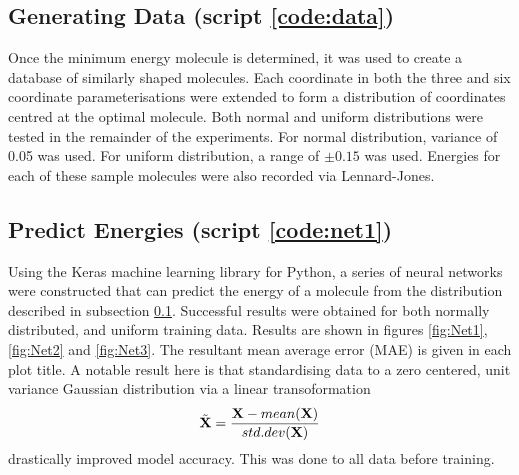 \documentclass[12pt,a4paper]{article}
\begin{document}
\subsection{Generating Data (script \ref{code:data})} \label{subsec:generate}
Once the minimum energy molecule is determined, it was used to create a database of similarly shaped molecules. Each coordinate in both the three and six coordinate parameterisations were extended to form a distribution of coordinates centred at the optimal molecule. Both normal and uniform distributions were tested in the remainder of the experiments. For normal distribution, variance of 0.05 was used. For uniform distribution, a range of $\pm 0.15$ was used. Energies for each of these sample molecules were also recorded via Lennard-Jones.
%
\subsection{Predict Energies (script \ref{code:net1})} \label{subsec:nrg}
Using the Keras\cite{noauthor_keras_nodate} machine learning library for Python, a series of neural networks were constructed that can predict the energy of a molecule from the distribution described in subsection \ref{subsec:generate}. Successful results were obtained for both normally distributed, and uniform training data. Results are shown in figures \ref{fig:Net1}, \ref{fig:Net2} and \ref{fig:Net3}. The resultant mean average error (MAE) is given in each plot title. A notable result here is that standardising data to a zero centered, unit variance Gaussian distribution via a linear transoformation 
\begin{equation*}
    \Tilde{\textbf{X}} = \frac {\textbf{X} - mean(\textbf{X})} {std.dev(\textbf{X})}
\end{equation*}
drastically improved model accuracy. This was done to all data before training.
\end{document}
